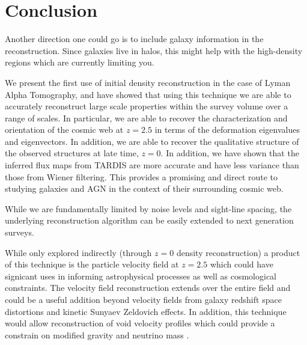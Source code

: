 \documentclass[times]{aastex62}
\begin{document}


\section{Conclusion}
\label{sec:conclusion}

{\color{red}Another direction one could go is to include galaxy information in the reconstruction.  Since galaxies live in halos, this might help with the high-density regions which are currently limiting you.}

We present the first use of initial density reconstruction in the case of Lyman Alpha Tomography, and have showed that using this technique we are able to accurately reconstruct large scale properties within the survey volume over a range of scales. In particular, we are able to recover the characterization and orientation of the cosmic web at $z=2.5$ in terms of the deformation eigenvalues and eigenvectors. In addition, we are able to recover the qualitative structure of the observed structures at late time, $z=0$. In addition, we have shown that the inferred flux maps from TARDIS are more accurate and have less variance than those from Wiener filtering. This provides a promising and direct route to studying galaxies and AGN in the context of their surrounding cosmic web.

While we are fundamentally limited by noise levels and sight-line spacing, the underlying reconstruction algorithm can be easily extended to next generation surveys.

While only explored indirectly (through $z=0$ density reconstruction) a product of this technique is the particle velocity field at $z=2.5$ which could have signicant uses in informing astrophysical processes as well as cosmological constraints. The velocity field reconstruction extends over the entire field and could be a useful addition beyond velocity fields from galaxy redshift space distortions and kinetic Sunyaev Zeldovich effects.\cite{2017Sugiyama} In addition, this technique would allow reconstruction of void velocity profiles which could provide a constrain on modified gravity \cite{2018Falck} and neutrino mass \cite{2015Massara}. 
\end{document}
